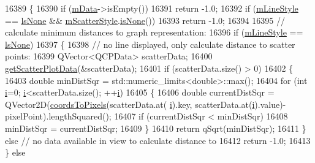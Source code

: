 \begin{DoxyCode}
16389 \{
16390   \textcolor{keywordflow}{if} (\hyperlink{class_q_c_p_graph_a8457c840f69a0ac49f61d30a509c5d08}{mData}->isEmpty())
16391     \textcolor{keywordflow}{return} -1.0;
16392   \textcolor{keywordflow}{if} (\hyperlink{class_q_c_p_graph_a8604fd98402035a63375849f7341ee25}{mLineStyle} == \hyperlink{class_q_c_p_graph_ad60175cd9b5cac937c5ee685c32c0859aea9591b933733cc7b20786b71e60fa04}{lsNone} && \hyperlink{class_q_c_p_graph_a4aa36241f166ccd1f75fc8f24e4a3247}{mScatterStyle}.\hyperlink{class_q_c_p_scatter_style_aa3861281108d0adbeb291c820ea3925c}{isNone}())
16393     \textcolor{keywordflow}{return} -1.0;
16394   
16395   \textcolor{comment}{// calculate minimum distances to graph representation:}
16396   \textcolor{keywordflow}{if} (\hyperlink{class_q_c_p_graph_a8604fd98402035a63375849f7341ee25}{mLineStyle} == \hyperlink{class_q_c_p_graph_ad60175cd9b5cac937c5ee685c32c0859aea9591b933733cc7b20786b71e60fa04}{lsNone})
16397   \{
16398     \textcolor{comment}{// no line displayed, only calculate distance to scatter points:}
16399     QVector<QCPData> scatterData;
16400     \hyperlink{class_q_c_p_graph_a45c4214b59ea11aa6d8d112bdc3b0e03}{getScatterPlotData}(&scatterData);
16401     \textcolor{keywordflow}{if} (scatterData.size() > 0)
16402     \{
16403       \textcolor{keywordtype}{double} minDistSqr = std::numeric\_limits<double>::max();
16404       \textcolor{keywordflow}{for} (\textcolor{keywordtype}{int} \hyperlink{_comparision_pictures_2_createtest_image_8m_a6f6ccfcf58b31cb6412107d9d5281426}{i}=0; \hyperlink{_comparision_pictures_2_createtest_image_8m_a6f6ccfcf58b31cb6412107d9d5281426}{i}<scatterData.size(); ++\hyperlink{_comparision_pictures_2_createtest_image_8m_a6f6ccfcf58b31cb6412107d9d5281426}{i})
16405       \{
16406         \textcolor{keywordtype}{double} currentDistSqr = QVector2D(\hyperlink{class_q_c_p_abstract_plottable_ade710a776104b14c1c835168ce1bfc5c}{coordsToPixels}(scatterData.at(
      \hyperlink{_comparision_pictures_2_createtest_image_8m_a6f6ccfcf58b31cb6412107d9d5281426}{i}).key, scatterData.at(\hyperlink{_comparision_pictures_2_createtest_image_8m_a6f6ccfcf58b31cb6412107d9d5281426}{i}).value)-pixelPoint).lengthSquared();
16407         \textcolor{keywordflow}{if} (currentDistSqr < minDistSqr)
16408           minDistSqr = currentDistSqr;
16409       \}
16410       \textcolor{keywordflow}{return} qSqrt(minDistSqr);
16411     \} \textcolor{keywordflow}{else} \textcolor{comment}{// no data available in view to calculate distance to}
16412       \textcolor{keywordflow}{return} -1.0;
16413   \} \textcolor{keywordflow}{else}

\end{DoxyCode}
